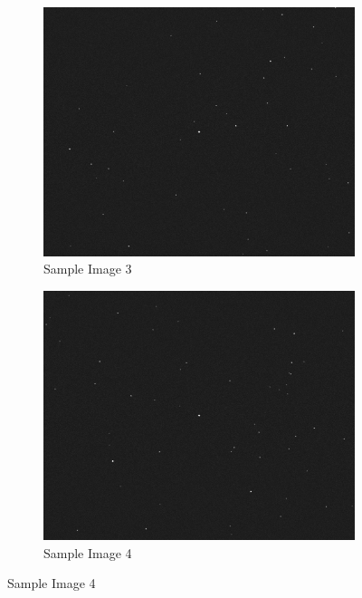 \begin{figure}[h!]
\begin{subfigure}[b]{0.45\textwidth}
    \end{subfigure}
    \\
    \begin{subfigure}[b]{0.45\textwidth}
        \centering
        \includegraphics[width=\textwidth]{Figures/Model/Sample Images/Image_3.png}
        \caption{Sample Image 3}
        \label{fig:sample_3}
    \end{subfigure}
    \hfill
    \begin{subfigure}[b]{0.45\textwidth}
         \centering
         \includegraphics[width=\textwidth]{Figures/Model/Sample Images/Image_4.png}
         \caption{Sample Image 4}

\end{subfigure}
\end{figure}
